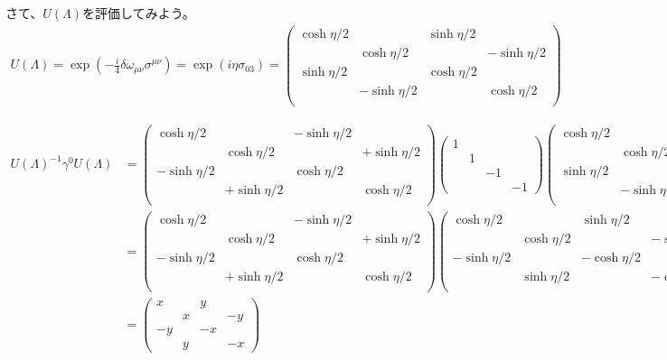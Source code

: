 \documentclass[10pt,a4paper]{jarticle}
\begin{document}
%
さて、$U(\Lambda)$を評価してみよう。
\begin{align}
U(\Lambda)
=
\exp\left( -\frac{i}{4} \delta\omega_{\mu\nu} \sigma^{\mu\nu} \right)
=
\exp\left( i \eta \sigma_{03} \right)
=
\left(\begin{array}{cccc}
\cosh\eta/2 & & \sinh\eta/2 & \\
& \cosh\eta/2 & & -\sinh\eta/2 \\
\sinh\eta/2 & & \cosh\eta/2 & \\
& -\sinh\eta/2 & & \cosh\eta/2 \\
\end{array}\right)
\end{align}

{\tiny
\begin{align}
U(\Lambda)^{-1} \gamma^0 U(\Lambda)
&=
\left(\begin{array}{cccc}
\cosh\eta/2 & & -\sinh\eta/2 & \\
& \cosh\eta/2 & & +\sinh\eta/2 \\
-\sinh\eta/2 & & \cosh\eta/2 & \\
& +\sinh\eta/2 & & \cosh\eta/2 \\
\end{array}\right)
%
\left(\begin{array}{cccc}
1&&&\\
&1&&\\
&&-1&\\
&&&-1
\end{array}\right)
%
\left(\begin{array}{cccc}
\cosh\eta/2 & & \sinh\eta/2 & \\
& \cosh\eta/2 & & -\sinh\eta/2 \\
\sinh\eta/2 & & \cosh\eta/2 & \\
& -\sinh\eta/2 & & \cosh\eta/2 \\
\end{array}\right) \nonumber\\
%
&=
\left(\begin{array}{cccc}
\cosh\eta/2 & & -\sinh\eta/2 & \\
& \cosh\eta/2 & & +\sinh\eta/2 \\
-\sinh\eta/2 & & \cosh\eta/2 & \\
& +\sinh\eta/2 & & \cosh\eta/2 \\
\end{array}\right)
%
\left(\begin{array}{cccc}
\cosh\eta/2 & & \sinh\eta/2 & \\
& \cosh\eta/2 & & -\sinh\eta/2 \\
-\sinh\eta/2 & & -\cosh\eta/2 & \\
& \sinh\eta/2 & & -\cosh\eta/2 \\
\end{array}\right) \nonumber\\
%
&=
\left(\begin{array}{cccc}
x&&y&\\
&x&&-y\\
-y&&-x&\\
&y&&-x
\end{array}\right) \nonumber\\
\end{align}
}
\end{document}
